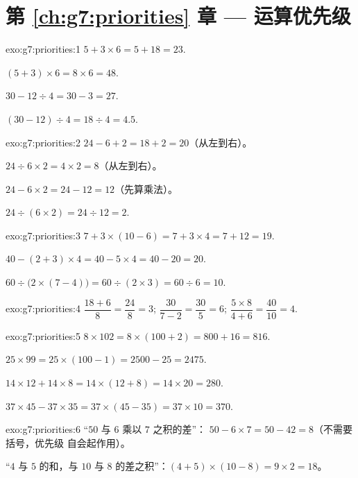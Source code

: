 \section*{第 \ref{ch:g7:priorities} 章 --- 运算优先级}

\begin{solution}{exo:g7:priorities:1}
$5 + 3 \times 6 = 5 + 18 = 23$.

$(5 + 3) \times 6 = 8 \times 6 = 48$.

$30 - 12 \div 4 = 30 - 3 = 27$.

$(30 - 12) \div 4 = 18 \div 4 = 4.5$.
\end{solution}

\begin{solution}{exo:g7:priorities:2}
$24 - 6 + 2 = 18 + 2 = 20$（从左到右）。

$24 \div 6 \times 2 = 4 \times 2 = 8$（从左到右）。

$24 - 6 \times 2 = 24 - 12 = 12$（先算乘法）。

$24 \div (6 \times 2) = 24 \div 12 = 2$.
\end{solution}

\begin{solution}{exo:g7:priorities:3}
$7 + 3 \times (10 - 6) = 7 + 3 \times 4 = 7 + 12 = 19$.

$40 - (2 + 3) \times 4 = 40 - 5 \times 4 = 40 - 20 = 20$.

$60 \div \bigl(2 \times (7 - 4)\bigr) = 60 \div (2 \times 3)
= 60 \div 6 = 10$.
\end{solution}

\begin{solution}{exo:g7:priorities:4}
$\dfrac{18 + 6}{8} = \dfrac{24}{8} = 3$; \quad
$\dfrac{30}{7 - 2} = \dfrac{30}{5} = 6$; \quad
$\dfrac{5 \times 8}{4 + 6} = \dfrac{40}{10} = 4$.
\end{solution}

\begin{solution}{exo:g7:priorities:5}
$8 \times 102 = 8 \times (100 + 2) = 800 + 16 = 816$.

$25 \times 99 = 25 \times (100 - 1) = 2500 - 25 = 2475$.

$14 \times 12 + 14 \times 8 = 14 \times (12 + 8) = 14 \times 20 = 280$.

$37 \times 45 - 37 \times 35 = 37 \times (45 - 35) = 37 \times 10 =
370$.
\end{solution}

\begin{solution}{exo:g7:priorities:6}
“$50$ 与 $6$ 乘以 $7$ 之积的差”：
$50 - 6 \times 7 = 50 - 42 = 8$（不需要括号，优先级
自会起作用）。

“$4$ 与 $5$ 的和，与 $10$ 与
$8$ 的差之积”：$(4 + 5) \times (10 - 8) = 9 \times 2 = 18$。
\end{solution}


